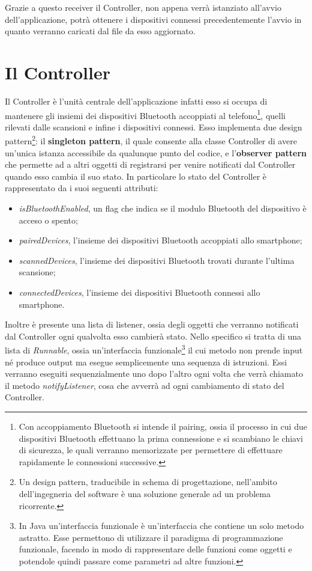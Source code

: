 Grazie a questo receiver il Controller, non appena verrà istanziato all'avvio dell'applicazione, potrà ottenere i dispositivi connessi precedentemente l'avvio in quanto verranno caricati dal file da esso aggiornato.

\section{Il Controller} \label{ref:controller}
Il Controller è l'unità centrale dell'applicazione infatti esso si occupa di mantenere gli insiemi dei dispositivi Bluetooth accoppiati al telefono\footnote{Con accoppiamento Bluetooth si intende il pairing, ossia il processo in cui due dispositivi Bluetooth effettuano la prima connessione e si scambiano le chiavi di sicurezza, le quali verranno memorizzate per permettere di effettuare rapidamente le connessioni successive.}, quelli rilevati dalle scansioni e infine i dispositivi connessi. Esso implementa due design pattern\footnote{Un design pattern, traducibile in schema di progettazione, nell'ambito dell'ingegneria del software è una soluzione generale ad un problema ricorrente.}: il \textbf{singleton pattern}, il quale consente alla classe Controller di avere un'unica istanza accessibile da qualunque punto del codice, e l'\textbf{observer pattern} che permette ad a altri oggetti di registrarsi per venire notificati dal Controller quando esso cambia il suo stato. In particolare lo stato del Controller è rappresentato da i suoi seguenti attributi:
\begin{itemize}
    \item \textit{isBluetoothEnabled}, un flag che indica se il modulo Bluetooth del dispositivo è acceso o spento;
    \item \textit{pairedDevices}, l'insieme dei dispositivi Bluetooth accoppiati allo smartphone;
    \item \textit{scannedDevices}, l'insieme dei dispositivi Bluetooth trovati durante l'ultima scansione;
    \item \textit{connectedDevices}, l'insieme dei dispositivi Bluetooth connessi allo smartphone.
\end{itemize}

Inoltre è presente una lista di listener, ossia degli oggetti che verranno notificati dal Controller ogni qualvolta esso cambierà stato. Nello specifico si tratta di una lista di \textit{Runnable}, ossia un'interfaccia funzionale\footnote{In Java un'interfaccia funzionale è un'interfaccia che contiene un solo metodo astratto. Esse permettono di utilizzare il paradigma di programmazione funzionale, facendo in modo di rappresentare delle funzioni come oggetti e potendole quindi passare come parametri ad altre funzioni.} il cui metodo non prende input né produce output ma esegue semplicemente una sequenza di istruzioni. Essi verranno eseguiti sequenzialmente uno dopo l'altro ogni volta che verrà chiamato il metodo \textit{notifyListener}, cosa che avverrà ad ogni cambiamento di stato del Controller.

